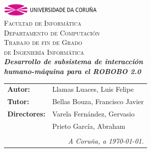 \begin{titlepage}
\begin{center}
\includegraphics[width=5cm]{imagenes/anagramaUDC.png}\\[0.5cm]
{\textsc{Facultad de Informática}} \\
{\large \textsc{Departamento de Computación}} \\[1cm]
{\Large \textsc{Trabajo de fin de Grado}} \\
{\Large \textsc{de Ingeniería Informática}} \\[2cm]
{\Large \textsl{\textbf{Desarrollo de subsistema de interacción  }}} \\[0.15cm]
{\Large \textsl{\textbf{humano-máquina para el ROBOBO 2.0}}} \\

\vfill
\begin{flushright}
\begin{tabular}{ll}
\textbf{Autor:}    & Llamas Luaces, Luis Felipe \\
\textbf{Tutor:} & Bellas Bouza, Francisco Javier \\
\textbf{Directores:}  & Varela Fernández, Gervasio \\ & Prieto García, Abraham  \\
& \\
\multicolumn{2}{r}{\small \emph{A Coruña, a \today{}.}} \\
\end{tabular}
\end{flushright}
\end{center}
\end{titlepage}
